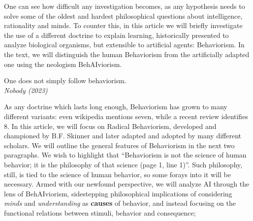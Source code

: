 \documentclass[letterpaper,11pt,twocolumn]{article}
\begin{document}
One can see how difficult any investigation becomes, as any hypothesis needs to solve some of the oldest and hardest philosophical questions about intelligence, rationality and minds. To counter this, in this article we will briefly investigate the use of a different doctrine to explain learning, historically presented to analyze biological organisms, but extensible to artificial agents: Behaviorism. In the text, we will distinguish the human Behaviorism from the artificially adapted one using the neologism BehAIviorism.

\begin{flushright}
    One does not simply follow behaviorism.\\
    \textit{Nobody (2023)}
\end{flushright}

As any doctrine which lasts long enough, Behaviorism has grown to many different variants: even wikipedia mentions seven\cite{Behaviorism2023}, while a recent review identifies 8\cite{araibaCurrentDiversificationBehaviorism2020}. In this article, we will focus on Radical Behaviorism, developed and championed by B.F. Skinner and later adapted and adopted by many different scholars. We will outline the general features of Behaviorism in the next two paragraphs. We wish to highlight that \enquote{Behaviorism is not the science of human behavior; it is the philosophy of that science (page 1, line 1)}\cite{skinnerBehaviorism1976}. Such philosophy, still, is tied to the science of human behavior, so some forays into it will be necessary. Armed with our newfound perspective, we will analyze AI through the lens of BehAIviorism, sidestepping philosophical implications of considering \textit{minds} and \textit{understanding} as \textbf{causes} of behavior, and instead focusing on the functional relations between stimuli, behavior and consequence;
\end{document}
